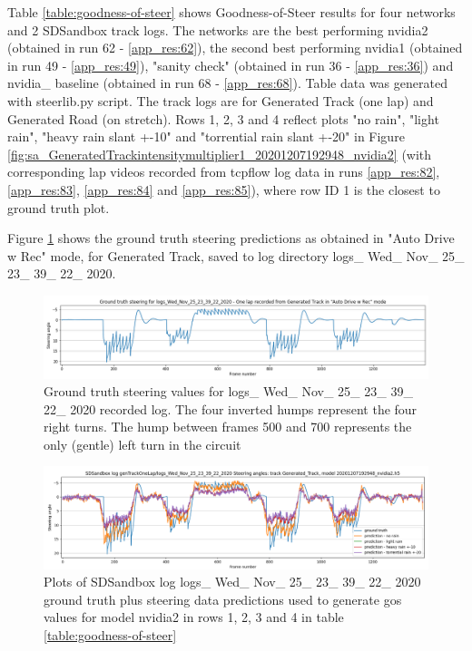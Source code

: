 Table \ref{table:goodness-of-steer} shows Goodness-of-Steer results for four networks and 2 SDSandbox track logs. The networks are the best performing nvidia2 (obtained in run 62 - \ref{app_res:62}), the second best performing nvidia1 (obtained in run 49 - \ref{app_res:49}), "sanity check" (obtained in run 36 - \ref{app_res:36}) and nvidia\_ baseline (obtained in run 68 - \ref{app_res:68}). Table data was generated with steerlib.py script. The track logs are for Generated Track (one lap) and Generated Road (on stretch). Rows 1, 2, 3 and 4 reflect plots "no rain", "light rain", "heavy rain slant +-10" and "torrential rain slant +-20" in Figure \ref{fig:sa_GeneratedTrackintensitymultiplier1_20201207192948_nvidia2} (with corresponding lap videos recorded from tcpflow log data in runs \ref{app_res:82}, \ref{app_res:83}, \ref{app_res:84} and  \ref{app_res:85}), where row ID 1 is the closest to ground truth plot. 

Figure \ref{fig:genTrackOneLap_logs_Wed_Nov_25_23_39_22_2020_ground_truth_steering_angles} shows the ground truth steering predictions as obtained in "Auto Drive w Rec" mode, for Generated Track, saved to log directory logs\_ Wed\_ Nov\_ 25\_ 23\_ 39\_ 22\_ 2020.

\begin{figure}[ht]
 \centering 
 \includegraphics[width=\textwidth]{Figures/genTrackOneLap_logs_Wed_Nov_25_23_39_22_2020_ground_truth_steering_angles.png}
 \caption{Ground truth steering values for logs\_ Wed\_ Nov\_ 25\_ 23\_ 39\_ 22\_ 2020 recorded log. The four inverted humps represent the four right turns. The hump between frames 500 and 700 represents the only (gentle) left turn in the circuit}
 \label{fig:genTrackOneLap_logs_Wed_Nov_25_23_39_22_2020_ground_truth_steering_angles} 
\end{figure}



\begin{figure}[ht]
 \centering 
 \includegraphics[width=\textwidth]{Figures/sa_Generated_Track_20201207192948_nvidia2.h5.png}
 \caption{Plots of SDSandbox log logs\_ Wed\_ Nov\_ 25\_ 23\_ 39\_ 22\_ 2020 ground truth plus steering data predictions used to generate gos values for model nvidia2 in rows 1, 2, 3 and 4 in table \ref{table:goodness-of-steer}}
 \label{fig:sa_Generated_Track_20201207192948_nvidia2.h5} 
\end{figure}

